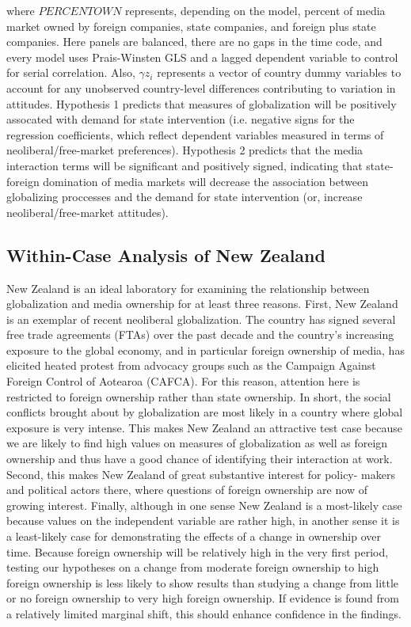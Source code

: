 \documentclass[12pt]{report}
\begin{document}
where $PERCENTOWN$ represents, depending on the model, percent of media market owned by foreign
companies, state companies, and foreign plus state companies. Here panels are balanced, there
are no gaps in the time code, and every model uses Prais-Winsten GLS and a lagged dependent
variable to control for serial correlation. Also, $\gamma z_i$ represents a vector of country
dummy variables to account for any unobserved country-level differences contributing to
variation in attitudes. Hypothesis 1 predicts that measures of globalization will be positively
assocated with demand for state intervention (i.e. negative signs for the regression
coefficients, which reflect dependent variables measured in terms of neoliberal/free-market
preferences). Hypothesis 2 predicts that the media interaction terms will be significant and
positively signed, indicating that state-foreign domination of media markets will decrease the
association between globalizing proccesses and the demand for state intervention (or, increase
neoliberal/free-market attitudes).

\subsection{Within-Case Analysis of New Zealand}

New Zealand is an ideal laboratory for examining the relationship between globalization and media ownership for at least three reasons. First, New Zealand is an exemplar of recent neoliberal globalization. The country has signed several free trade agreements (FTAs) over the past decade and the country's increasing exposure to the
global economy, and in particular foreign ownership of media, has elicited heated protest from
advocacy groups such as the Campaign Against Foreign Control of Aotearoa (CAFCA). For this reason,
attention here is restricted to foreign ownership rather than state ownership. In short, the social
conflicts brought about by globalization are most likely in a country where global exposure is very
intense. This makes New Zealand an attractive test case because we are likely to find high values on
measures of globalization as well as foreign ownership and thus have a good chance of identifying
their interaction at work. Second, this makes New Zealand of great substantive interest for policy-
makers and political actors there, where questions of foreign ownership are now of growing interest.
Finally, although in one sense New Zealand is a most-likely case because values on the independent
variable are rather high, in another sense it is a least-likely case for demonstrating the effects
of a change in ownership over time. Because foreign ownership will be relatively high in the very
first period, testing our hypotheses on a change from moderate foreign ownership to high foreign
ownership is less likely to show results than studying a change from little or no foreign ownership
to very high foreign ownership. If evidence is found from a relatively limited marginal shift, this
should enhance confidence in the findings.
\end{document}
